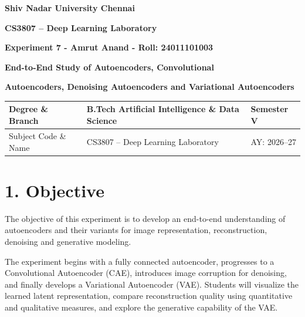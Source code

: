 \documentclass[10pt]{article}
\begin{document}

\begin{center}

{\large\textbf{Shiv Nadar University Chennai}}

\vspace{2mm}

{\normalsize\textbf{CS3807 -- Deep Learning Laboratory}}

\vspace{2mm}

{\large\textbf{Experiment 7 - Amrut Anand - Roll: 24011101003}}

\vspace{1mm}

{\normalsize\textbf{End-to-End Study of Autoencoders, Convolutional}}

{\normalsize\textbf{Autoencoders, Denoising Autoencoders and Variational Autoencoders}}

\end{center}

\vspace{3mm}

\begin{tabular}{|p{3.4cm}|p{9.0cm}|p{1.4cm}|}
\hline
Degree \& Branch &
B.Tech Artificial Intelligence \& Data Science &
Semester V\\
\hline
Subject Code \& Name &
CS3807 -- Deep Learning Laboratory &
AY: 2026--27\\
\hline
\end{tabular}

\section*{1. Objective}

The objective of this experiment is to develop an end-to-end understanding of
autoencoders and their variants for image representation, reconstruction,
denoising and generative modeling.

The experiment begins with a fully connected autoencoder, progresses to a
Convolutional Autoencoder (CAE), introduces image corruption for denoising,
and finally develops a Variational Autoencoder (VAE). Students will visualize
the learned latent representation, compare reconstruction quality using
quantitative and qualitative measures, and explore the generative capability
of the VAE.
\end{document}
